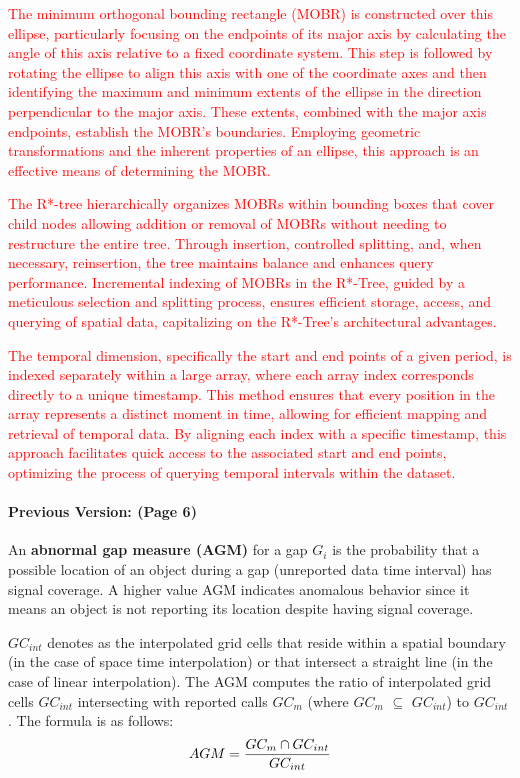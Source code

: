 \documentclass[twoside,leqno,onecolumn]{article}
\begin{document}
\textcolor{red}{The minimum orthogonal bounding rectangle (MOBR) is constructed over this ellipse, particularly focusing on the endpoints of its major axis by calculating the angle of this axis relative to a fixed coordinate system. This step is followed by rotating the ellipse to align this axis with one of the coordinate axes and then identifying the maximum and minimum extents of the ellipse in the direction perpendicular to the major axis. These extents, combined with the major axis endpoints, establish the MOBR's boundaries. Employing geometric transformations and the inherent properties of an ellipse, this approach is an effective means of determining the MOBR.}

\textcolor{red}{The R*-tree hierarchically organizes MOBRs within bounding boxes that cover child nodes allowing addition or removal of MOBRs without needing to restructure the entire tree. Through insertion, controlled splitting, and, when necessary, reinsertion, the tree maintains balance and enhances query performance. Incremental indexing of MOBRs in the R*-Tree, guided by a meticulous selection and splitting process, ensures efficient storage, access, and querying of spatial data, capitalizing on the R*-Tree's architectural advantages.}

\textcolor{red}{The temporal dimension, specifically the start and end points of a given period, is indexed separately within a large array, where each array index corresponds directly to a unique timestamp. This method ensures that every position in the array represents a distinct moment in time, allowing for efficient mapping and retrieval of temporal data. By aligning each index with a specific timestamp, this approach facilitates quick access to the associated start and end points, optimizing the process of querying temporal intervals within the dataset.}\\


\paragraph{Previous Version: (Page 6)} An \textbf{abnormal gap measure (AGM)} for a gap $G_{i}$ is the probability that a possible location of an object during a gap (unreported data time interval) has signal coverage. A higher value AGM indicates anomalous behavior since it means an object is not reporting its location despite having signal coverage.

$GC_{int}$ denotes as the interpolated grid cells that reside within a spatial boundary (in the case of space time interpolation) or that intersect a  straight line (in the case of linear interpolation). The AGM computes the ratio of interpolated grid cells $GC_{int}$ intersecting with reported calls $GC_{m}$ (where $GC_{m}$ $\subseteq$ $GC_{int}$) to $GC_{int}$ . The formula is as follows:
\begin{equation}
\centering
   AGM = \frac{GC_{m} \cap GC_{int}}{GC_{int}}
\end{equation}
\end{document}
